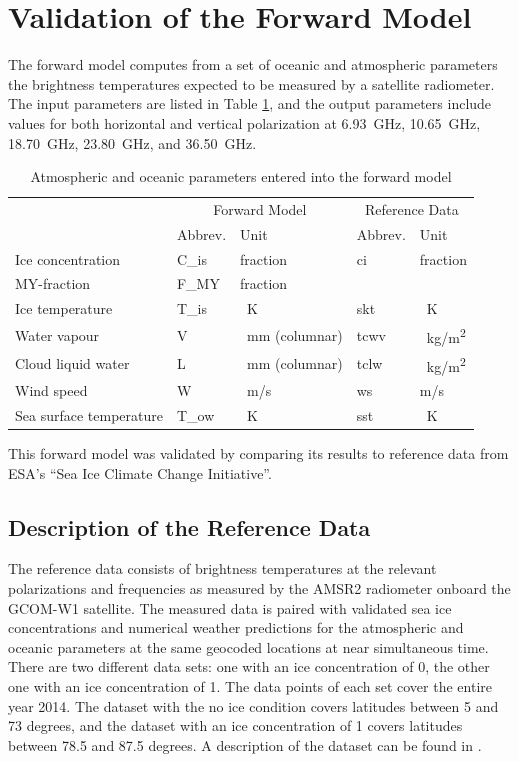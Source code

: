 \documentclass[11pt, a4paper]{article}
\begin{document}
\newpage
\section{Validation of the Forward Model}

The forward model computes from a set of oceanic and atmospheric parameters the brightness temperatures expected to be measured by a satellite radiometer. The input parameters are listed in Table \ref{tab:input_parameters}, and the output parameters include values for both horizontal and vertical polarization at \SI{6.93}{GHz}, \SI{10.65}{GHz}, \SI{18.70}{GHz}, \SI{23.80}{GHz}, and \SI{36.50}{GHz}.

\begin{table}[h!]
\centering
\begin{tabular}{@{}p{4cm} p{1.8cm}p{2.8cm}p{1.8cm}p{1.8cm}@{}}
\tabularnewline
& \multicolumn{2}{c}{Forward Model} & \multicolumn{2}{c}{Reference Data}
\tabularnewline
\cmidrule(r{1em}){2-3} \cmidrule(l{1em}){4-5}
& Abbrev. & Unit & Abbrev. & Unit
\tabularnewline
\midrule
Ice concentration	& C\_is	& fraction		& ci	& fraction	\\
MY-fraction		& F\_MY	& fraction		& 	& 		\\
Ice temperature		& T\_is	& \SI{}{K}	& skt	& \SI{}{K}	\\
Water vapour		& V	& \SI{}{mm} (columnar)	& tcwv	& \SI{}{kg/m^2}	\\
Cloud liquid water	& L	& \SI{}{mm} (columnar)	& tclw	& \SI{}{kg/m^2}	\\
Wind speed		& W	& \SI{}{m/s}		& ws	& m/s		\\
Sea surface temperature	& T\_ow	& \SI{}{K}	& sst	& \SI{}{K}	\\
\midrule
\end{tabular}
\caption{Atmospheric and oceanic parameters entered into the forward model}
\label{tab:input_parameters}
\end{table}

This forward model was validated by comparing its results to reference data from ESA's ``Sea Ice Climate Change Initiative''.



\subsection{Description of the Reference Data}

The reference data consists of brightness temperatures at the relevant polarizations and frequencies as measured by the AMSR2 radiometer onboard the GCOM-W1 satellite. The measured data is paired with validated sea ice concentrations and numerical weather predictions for the atmospheric and oceanic parameters at the same geocoded locations at near simultaneous time. There are two different data sets: one with an ice concentration of 0, the other one with an ice concentration of 1. The data points of each set cover the entire year 2014. The dataset with the no ice condition covers latitudes between 5 and 73 degrees, and the dataset with an ice concentration of 1 covers latitudes between 78.5 and 87.5 degrees. A description of the dataset can be found in \cite{Wink2}.
\end{document}
